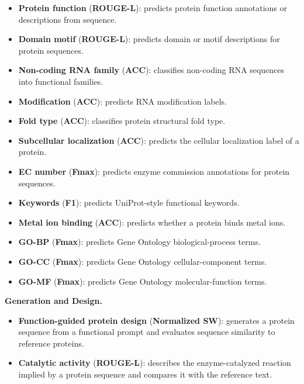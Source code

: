 \begin{appendices}
\begin{itemize}
    \item \textbf{Protein function} (\textbf{ROUGE-L}): predicts protein function annotations or descriptions from sequence.
    \item \textbf{Domain motif} (\textbf{ROUGE-L}): predicts domain or motif descriptions for protein sequences.
    \item \textbf{Non-coding RNA family} (\textbf{ACC}): classifies non-coding RNA sequences into functional families.
    \item \textbf{Modification} (\textbf{ACC}): predicts RNA modification labels.
    \item \textbf{Fold type} (\textbf{ACC}): classifies protein structural fold type.
    \item \textbf{Subcellular localization} (\textbf{ACC}): predicts the cellular localization label of a protein.
    \item \textbf{EC number} (\textbf{Fmax}): predicts enzyme commission annotations for protein sequences.
    \item \textbf{Keywords} (\textbf{F1}): predicts UniProt-style functional keywords.
    \item \textbf{Metal ion binding} (\textbf{ACC}): predicts whether a protein binds metal ions.
    \item \textbf{GO-BP} (\textbf{Fmax}): predicts Gene Ontology biological-process terms.
    \item \textbf{GO-CC} (\textbf{Fmax}): predicts Gene Ontology cellular-component terms.
    \item \textbf{GO-MF} (\textbf{Fmax}): predicts Gene Ontology molecular-function terms.
\end{itemize}

\textbf{Generation and Design.}
\begin{itemize}
    \item \textbf{Function-guided protein design} (\textbf{Normalized SW}): generates a protein sequence from a functional prompt and evaluates sequence similarity to reference proteins.
    \item \textbf{Catalytic activity} (\textbf{ROUGE-L}): describes the enzyme-catalyzed reaction implied by a protein sequence and compares it with the reference text.
\end{itemize}
 
 
 
 
 
 
 
 
 
 
 

\end{appendices}
